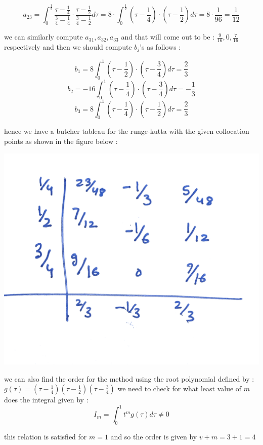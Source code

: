 \documentclass[12pt,letterpaper]{article}
\begin{document}
\[ a_{23} = \int_{0}^{\frac{1}{2}} \frac{\tau-\frac{1}{4}}{\frac{3}{4} - \frac{1}{4}} \cdot  \frac{\tau-\frac{1}{2}}{\frac{3}{4} - \frac{1}{2}}d\tau = 8 \cdot \int_{0}^{\frac{1}{2}} \left(\tau-\frac{1}{4}\right) \cdot  \left(\tau-\frac{1}{2}\right) d\tau = 8 \cdot \frac{1}{96} = \frac{1}{12} \]

we can similarly compute $a_{31}, a_{32}, a_{33}$ and that will come out to be : $\frac{9}{16}, 0, \frac{7}{16}$ respectively and then we should compute $b_j$'s as follows :

\[b_1 =  8 \int_{0}^{1} \left(\tau - \frac{1}{2}\right) \cdot \left(\tau - \frac{3}{4}\right) d\tau = \frac{2}{3}\]
\[b_2 =  -16 \int_{0}^{1} \left(\tau - \frac{1}{4}\right) \cdot \left(\tau - \frac{3}{4}\right) d\tau = -\frac{1}{3}\]
\[b_3 =  8 \int_{0}^{1} \left(\tau - \frac{1}{4}\right) \cdot \left(\tau - \frac{1}{2}\right) d\tau = \frac{2}{3}\]

hence we have a butcher tableau for the runge-kutta with the given collocation points as shown in the figure below : 

\begin{center}
    \includegraphics[scale=0.1]{file_2.png}
\end{center}
\newline
we can also find the order for the method using the root polynomial defined by :  $g(\tau) = \left(\tau - \frac{1}{4}\right) \left(\tau - \frac{1}{2}\right) \left(\tau - \frac{3}{4}\right)$ 
\newline
\newline
we need to check for what least value of $m$ does the integral given by :
\[I_m = \int_{0}^{1} t^m g(\tau) d\tau \not= 0\]

this relation is satisfied for $m=1$ and so the order is given by $v + m = 3 + 1 = 4$
\end{document}
